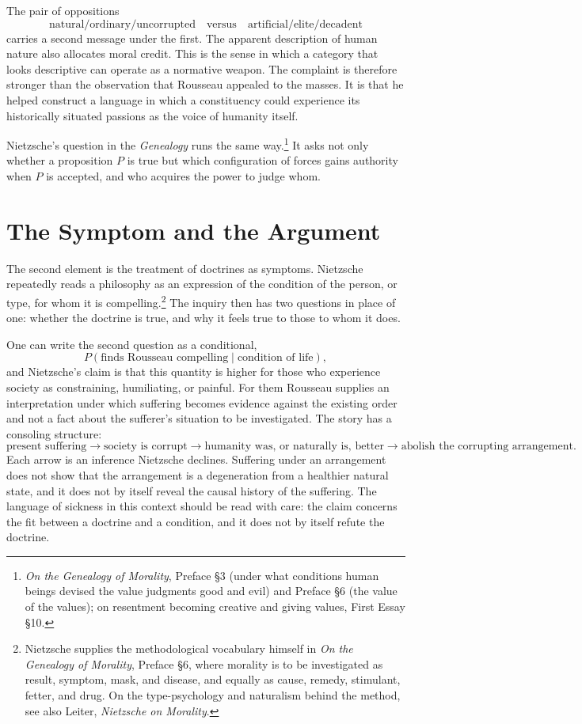 \documentclass[11pt]{article}
\theoremstyle{definition}
\begin{document}
The pair of oppositions
\[
\text{natural} / \text{ordinary} / \text{uncorrupted}
\quad\text{versus}\quad
\text{artificial} / \text{elite} / \text{decadent}
\]
carries a second message under the first. The apparent description of human nature also allocates moral credit. This is the sense in which a category that looks descriptive can operate as a normative weapon. The complaint is therefore stronger than the observation that Rousseau appealed to the masses. It is that he helped construct a language in which a constituency could experience its historically situated passions as the voice of humanity itself.

Nietzsche's question in the \emph{Genealogy} runs the same way.\footnote{\emph{On the Genealogy of Morality}, Preface \S3 (under what conditions human beings devised the value judgments good and evil) and Preface \S6 (the value of the values); on resentment becoming creative and giving values, First Essay \S10.} It asks not only whether a proposition $P$ is true but which configuration of forces gains authority when $P$ is accepted, and who acquires the power to judge whom.

\section{The Symptom and the Argument}

The second element is the treatment of doctrines as symptoms. Nietzsche repeatedly reads a philosophy as an expression of the condition of the person, or type, for whom it is compelling.\footnote{Nietzsche supplies the methodological vocabulary himself in \emph{On the Genealogy of Morality}, Preface \S6, where morality is to be investigated as result, symptom, mask, and disease, and equally as cause, remedy, stimulant, fetter, and drug. On the type-psychology and naturalism behind the method, see also Leiter, \emph{Nietzsche on Morality}.} The inquiry then has two questions in place of one: whether the doctrine is true, and why it feels true to those to whom it does.

One can write the second question as a conditional,
\[
P(\text{finds Rousseau compelling}\mid \text{condition of life}),
\]
and Nietzsche's claim is that this quantity is higher for those who experience society as constraining, humiliating, or painful. For them Rousseau supplies an interpretation under which suffering becomes evidence against the existing order and not a fact about the sufferer's situation to be investigated. The story has a consoling structure:
\[
\text{present suffering}
\rightarrow
\text{society is corrupt}
\rightarrow
\text{humanity was, or naturally is, better}
\rightarrow
\text{abolish the corrupting arrangement}.
\]
Each arrow is an inference Nietzsche declines. Suffering under an arrangement does not show that the arrangement is a degeneration from a healthier natural state, and it does not by itself reveal the causal history of the suffering. The language of sickness in this context should be read with care: the claim concerns the fit between a doctrine and a condition, and it does not by itself refute the doctrine.
\end{document}
